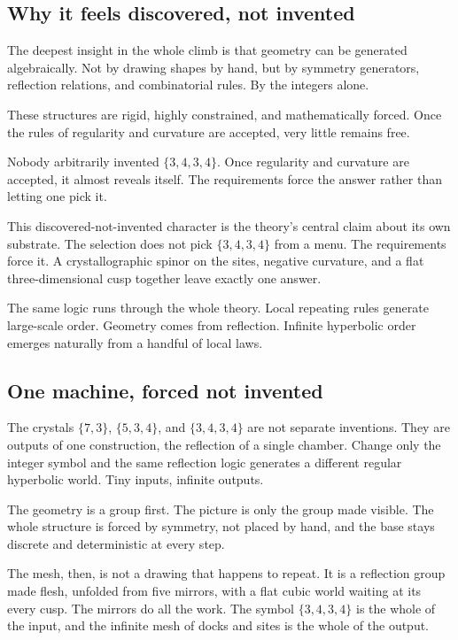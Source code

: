 \subsection{Why it feels discovered, not invented}

The deepest insight in the whole climb is that geometry can be generated algebraically. Not by drawing shapes by hand, but by symmetry generators, reflection relations, and combinatorial rules. By the integers alone.

These structures are rigid, highly constrained, and mathematically forced. Once the rules of regularity and curvature are accepted, very little remains free.

\begin{principle}
Nobody arbitrarily invented $\{3,4,3,4\}$. Once regularity and curvature are accepted, it almost reveals itself. The requirements force the answer rather than letting one pick it.
\end{principle}

This discovered-not-invented character is the theory's central claim about its own substrate. The selection does not pick $\{3,4,3,4\}$ from a menu. The requirements force it. A crystallographic spinor on the sites, negative curvature, and a flat three-dimensional cusp together leave exactly one answer.

The same logic runs through the whole theory. Local repeating rules generate large-scale order. Geometry comes from reflection. Infinite hyperbolic order emerges naturally from a handful of local laws.

\subsection{One machine, forced not invented}

The crystals $\{7,3\}$, $\{5,3,4\}$, and $\{3,4,3,4\}$ are not separate inventions. They are outputs of one construction, the reflection of a single chamber. Change only the integer symbol and the same reflection logic generates a different regular hyperbolic world. Tiny inputs, infinite outputs.

\begin{principle}
The geometry is a group first. The picture is only the group made visible. The whole structure is forced by symmetry, not placed by hand, and the base stays discrete and deterministic at every step.
\end{principle}

The mesh, then, is not a drawing that happens to repeat. It is a reflection group made flesh, unfolded from five mirrors, with a flat cubic world waiting at its every cusp. The mirrors do all the work. The symbol $\{3,4,3,4\}$ is the whole of the input, and the infinite mesh of docks and sites is the whole of the output.
